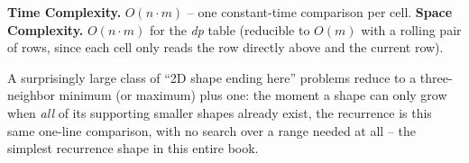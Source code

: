 \begin{complexitybox}
\textbf{Time Complexity.} $O(n \cdot m)$ -- one constant-time
comparison per cell.
\textbf{Space Complexity.} $O(n \cdot m)$ for the \textit{dp} table
(reducible to $O(m)$ with a rolling pair of rows, since each cell only
reads the row directly above and the current row).
\end{complexitybox}

\begin{takeawaybox}
A surprisingly large class of ``2D shape ending here'' problems reduce
to a three-neighbor minimum (or maximum) plus one: the moment a shape
can only grow when \emph{all} of its supporting smaller shapes already
exist, the recurrence is this same one-line comparison, with no search
over a range needed at all -- the simplest recurrence shape in this
entire book.
\end{takeawaybox}
